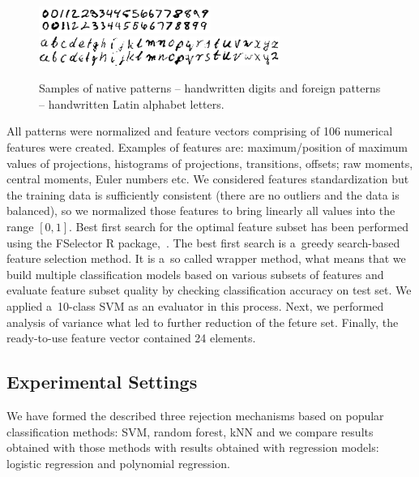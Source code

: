 \documentclass{llncs}
\begin{document}
\begin{figure}[!htb]
  \centering
  \includegraphics[width=0.5\textwidth]{_Figures/native}\\
  \includegraphics[width=0.7\textwidth]{_Figures/foreigns}
  \caption{Samples of native patterns -- handwritten digits and foreign patterns -- handwritten Latin alphabet letters.}
\label{fig:nativeforeignpatterns}
\end{figure}

All patterns were normalized and feature vectors comprising of 106 numerical features were created. Examples of features are: maximum/position of maximum values of projections, histograms of projections, transitions, offsets; raw moments, central moments, Euler numbers etc. We considered features standardization but the training data is sufficiently consistent (there are no outliers and the data is balanced), so we normalized those features to bring linearly all values into the range $[0,1]$. Best first search for the optimal feature subset has been performed using the FSelector R package,~\cite{Romanski}. The best first search is a~greedy search-based feature selection method. It is a~so called wrapper method, what means that we build multiple classification models based on various subsets of features and evaluate feature subset quality by checking classification accuracy on test set. We applied a~10-class SVM as an evaluator in this process. Next, we performed analysis of variance what led to further reduction of the feture set. Finally, the ready-to-use feature vector contained 24 elements. 




\subsection{Experimental Settings}
\vspace{-3pt}

We have formed the described three rejection mechanisms based on popular classification methods: SVM, random forest, kNN and we compare results obtained with those methods with results obtained with regression models: logistic regression and polynomial regression. 
\end{document}
